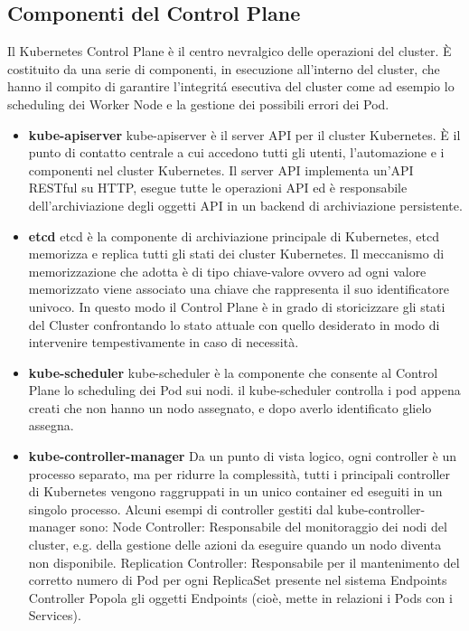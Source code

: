 \subsection{Componenti del Control Plane}
Il Kubernetes Control Plane è il centro nevralgico delle operazioni del cluster. È costituito da una serie di componenti, in esecuzione all'interno del cluster, che hanno il compito di garantire l'integritá esecutiva del cluster come ad esempio lo scheduling dei Worker Node e la gestione dei possibili errori dei Pod.
\begin{itemize}
    \item\textbf{kube-apiserver}
    kube-apiserver è il server API per il cluster Kubernetes. È il punto di contatto centrale a cui accedono tutti gli utenti, l'automazione e i componenti nel cluster Kubernetes. Il server API implementa un'API RESTful su HTTP, esegue tutte le operazioni API ed è responsabile dell'archiviazione degli oggetti API in un backend di archiviazione persistente.
    \item\textbf{etcd}
    etcd è la componente di archiviazione principale di Kubernetes, etcd memorizza e replica tutti gli stati dei cluster Kubernetes. Il meccanismo di memorizzazione che adotta è di tipo chiave-valore ovvero ad ogni valore memorizzato viene associato una chiave che rappresenta il suo identificatore univoco. In questo modo il Control Plane è in grado di storicizzare gli stati del Cluster confrontando lo stato attuale con quello desiderato in modo di intervenire tempestivamente in caso di necessità.
    \item\textbf{kube-scheduler}
    kube-scheduler è la componente che consente al Control Plane lo scheduling dei Pod sui nodi. il kube-scheduler controlla i pod appena creati che non hanno un nodo assegnato, e dopo averlo identificato glielo assegna. 
    \item\textbf{kube-controller-manager} 
    Da un punto di vista logico, ogni controller è un processo separato, ma per ridurre la complessità, tutti i principali controller di Kubernetes vengono raggruppati in un unico container ed eseguiti in un singolo processo.
    Alcuni esempi di controller gestiti dal kube-controller-manager sono:
    Node Controller: Responsabile del monitoraggio dei nodi del cluster, e.g. della gestione delle azioni da eseguire quando un nodo diventa non disponibile.
    Replication Controller: Responsabile per il mantenimento del corretto numero di Pod per ogni ReplicaSet presente nel sistema
    Endpoints Controller Popola gli oggetti Endpoints (cioè, mette in relazioni i Pods con i Services).

\end{itemize}
